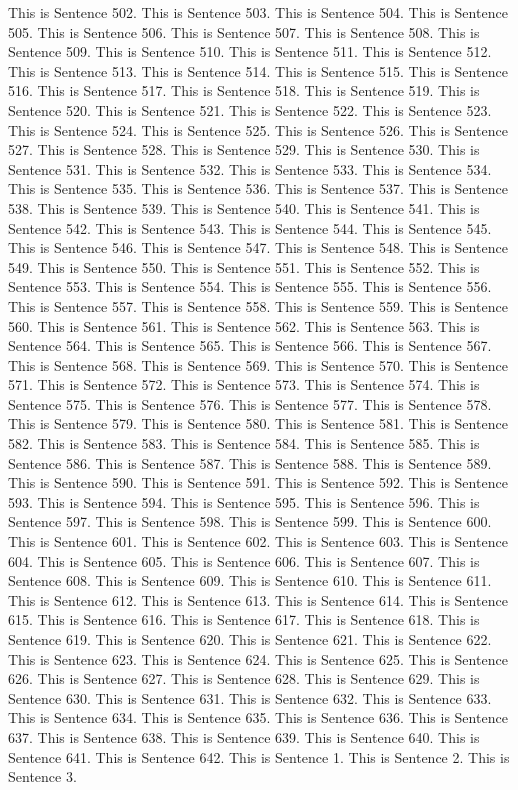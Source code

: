 \documentclass{article}
\begin{document}
This is Sentence 502.
This is Sentence 503.
This is Sentence 504.
This is Sentence 505.
This is Sentence 506.
This is Sentence 507.
This is Sentence 508.
This is Sentence 509.
This is Sentence 510.
This is Sentence 511.
This is Sentence 512.
This is Sentence 513.
This is Sentence 514.
This is Sentence 515.
This is Sentence 516.
This is Sentence 517.
This is Sentence 518.
This is Sentence 519.
This is Sentence 520.
This is Sentence 521.
This is Sentence 522.
This is Sentence 523.
This is Sentence 524.
This is Sentence 525.
This is Sentence 526.
This is Sentence 527.
This is Sentence 528.
This is Sentence 529.
This is Sentence 530.
This is Sentence 531.
This is Sentence 532.
This is Sentence 533.
This is Sentence 534.
This is Sentence 535.
This is Sentence 536.
This is Sentence 537.
This is Sentence 538.
This is Sentence 539.
This is Sentence 540.
This is Sentence 541.
This is Sentence 542.
This is Sentence 543.
This is Sentence 544.
This is Sentence 545.
This is Sentence 546.
This is Sentence 547.
This is Sentence 548.
This is Sentence 549.
This is Sentence 550.
This is Sentence 551.
This is Sentence 552.
This is Sentence 553.
This is Sentence 554.
This is Sentence 555.
This is Sentence 556.
This is Sentence 557.
This is Sentence 558.
This is Sentence 559.
This is Sentence 560.
This is Sentence 561.
This is Sentence 562.
This is Sentence 563.
This is Sentence 564.
This is Sentence 565.
This is Sentence 566.
This is Sentence 567.
This is Sentence 568.
This is Sentence 569.
This is Sentence 570.
This is Sentence 571.
This is Sentence 572.
This is Sentence 573.
This is Sentence 574.
This is Sentence 575.
This is Sentence 576.
This is Sentence 577.
This is Sentence 578.
This is Sentence 579.
This is Sentence 580.
This is Sentence 581.
This is Sentence 582.
This is Sentence 583.
This is Sentence 584.
This is Sentence 585.
This is Sentence 586.
This is Sentence 587.
This is Sentence 588.
This is Sentence 589.
This is Sentence 590.
This is Sentence 591.
This is Sentence 592.
This is Sentence 593.
This is Sentence 594.
This is Sentence 595.
This is Sentence 596.
This is Sentence 597.
This is Sentence 598.
This is Sentence 599.
This is Sentence 600.
This is Sentence 601.
This is Sentence 602.
This is Sentence 603.
This is Sentence 604.
This is Sentence 605.
This is Sentence 606.
This is Sentence 607.
This is Sentence 608.
This is Sentence 609.
This is Sentence 610.
This is Sentence 611.
This is Sentence 612.
This is Sentence 613.
This is Sentence 614.
This is Sentence 615.
This is Sentence 616.
This is Sentence 617.
This is Sentence 618.
This is Sentence 619.
This is Sentence 620.
This is Sentence 621.
This is Sentence 622.
This is Sentence 623.
This is Sentence 624.
This is Sentence 625.
This is Sentence 626.
This is Sentence 627.
This is Sentence 628.
This is Sentence 629.
This is Sentence 630.
This is Sentence 631.
This is Sentence 632.
This is Sentence 633.
This is Sentence 634.
This is Sentence 635.
This is Sentence 636.
This is Sentence 637.
This is Sentence 638.
This is Sentence 639.
This is Sentence 640.
This is Sentence 641.
This is Sentence 642.
This is Sentence 1.
This is Sentence 2.
This is Sentence 3.
\end{document}
